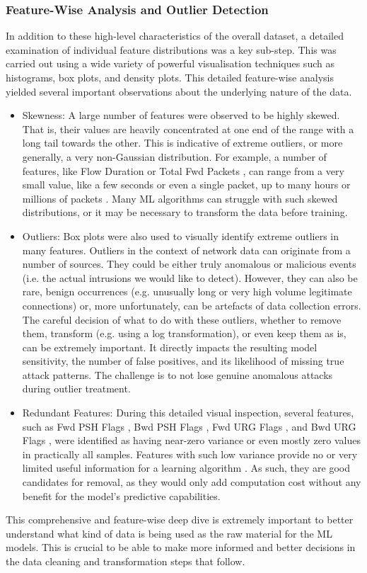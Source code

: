 \subsubsection{Feature-Wise Analysis and Outlier Detection} 
In addition to these high-level characteristics of the overall dataset, a detailed examination of individual feature distributions was a key sub-step. This was carried out using a wide variety of powerful visualisation techniques such as histograms, box plots, and density plots. This detailed feature-wise analysis yielded several important observations about the underlying nature of the data.
\begin{itemize}[noitemsep] 
\item Skewness: A large number of features were observed to be highly skewed. That is, their values are heavily concentrated at one end of the range with a long tail towards the other. This is indicative of extreme outliers, or more generally, a very non-Gaussian distribution. For example, a number of features, like Flow Duration or Total Fwd Packets , can range from a very small value, like a few seconds or even a single packet, up to many hours or millions of packets \parencite{al2022cicids}. Many ML algorithms can struggle with such skewed distributions, or it may be necessary to transform the data before training.
\item Outliers: Box plots were also used to visually identify extreme outliers in many features. Outliers in the context of network data can originate from a number of sources. They could be either truly anomalous or malicious events (i.e. the actual intrusions we would like to detect). However, they can also be rare, benign occurrences (e.g. unusually long or very high volume legitimate connections) or, more unfortunately, can be artefacts of data collection errors. The careful decision of what to do with these outliers, whether to remove them, transform (e.g. using a log transformation), or even keep them as is, can be extremely important. It directly impacts the resulting model sensitivity, the number of false positives, and its likelihood of missing true attack patterns. The challenge is to not lose genuine anomalous attacks during outlier treatment.
\item Redundant Features: During this detailed visual inspection, several features, such as Fwd PSH Flags , Bwd PSH Flags , Fwd URG Flags , and Bwd URG Flags , were identified as having near-zero variance or even mostly zero values in practically all samples. Features with such low variance provide no or very limited useful information for a learning algorithm \parencite{kumar2021cicids}. As such, they are good candidates for removal, as they would only add computation cost without any benefit for the model's predictive capabilities.
\end{itemize} 
This comprehensive and feature-wise deep dive is extremely important to better understand what kind of data is being used as the raw material for the ML models. This is crucial to be able to make more informed and better decisions in the data cleaning and transformation steps that follow.

